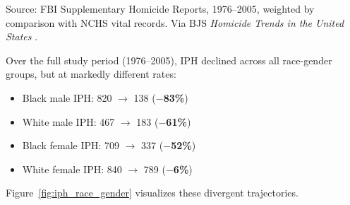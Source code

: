 \documentclass[12pt, letterpaper]{article}
\begin{document}
\begin{table}[H]
\noindent\footnotesize{Source: FBI Supplementary Homicide Reports, 1976--2005, weighted by comparison with NCHS vital records. Via BJS \textit{Homicide Trends in the United States} \citep{fox2007}.}
\end{table}

Over the full study period (1976--2005), IPH declined across all race-gender groups, but at markedly different rates:
\begin{itemize}[nosep]
    \item Black male IPH: 820 $\rightarrow$ 138 (\textbf{$-$83\%})
    \item White male IPH: 467 $\rightarrow$ 183 (\textbf{$-$61\%})
    \item Black female IPH: 709 $\rightarrow$ 337 (\textbf{$-$52\%})
    \item White female IPH: 840 $\rightarrow$ 789 (\textbf{$-$6\%})
\end{itemize}

Figure~\ref{fig:iph_race_gender} visualizes these divergent trajectories.
\end{document}
